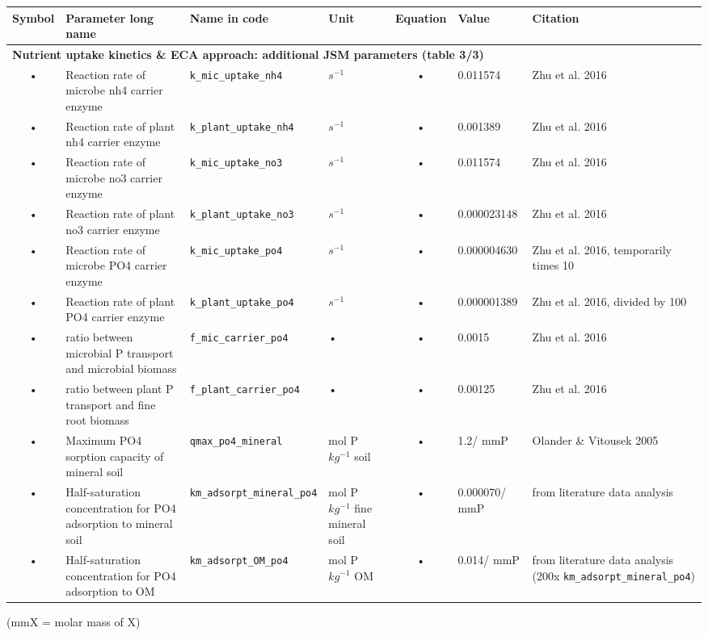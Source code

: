 \begin{table}
\begin{tabularx}{\linewidth}{|c|X|l|l|c|l|X|} %
\hline 
Symbol & Parameter long name & Name in code & Unit & Equation & Value & Citation \\ 
\hline 

\multicolumn{6}{l}{\bf Nutrient uptake kinetics \& ECA approach: additional JSM parameters (table 3/3)}\\
\hline
• & Reaction rate of microbe nh4 carrier enzyme & \texttt{k\_mic\_uptake\_nh4} & $s^{-1}$ & • & 0.011574 & Zhu et al. 2016 \\
• & Reaction rate of plant nh4 carrier enzyme & \texttt{k\_plant\_uptake\_nh4} & $s^{-1}$ & • & 0.001389 & Zhu et al. 2016 \\
• & Reaction rate of microbe no3 carrier enzyme & \texttt{k\_mic\_uptake\_no3} & $s^{-1}$ & • & 0.011574 & Zhu et al. 2016 \\
• & Reaction rate of plant no3 carrier enzyme & \texttt{k\_plant\_uptake\_no3} & $s^{-1}$ & • & 0.000023148 & Zhu et al. 2016 \\
• & Reaction rate of microbe PO4 carrier enzyme & \texttt{k\_mic\_uptake\_po4} & $s^{-1}$ & • & 0.000004630 & Zhu et al. 2016, temporarily times 10 \\
• & Reaction rate of plant PO4 carrier enzyme & \texttt{k\_plant\_uptake\_po4} & $s^{-1}$ & • & 0.000001389 & Zhu et al. 2016, divided by 100 \\
• & ratio between microbial P transport and microbial biomass & \texttt{f\_mic\_carrier\_po4} & • & • & 0.0015 & Zhu et al. 2016 \\
• & ratio between plant P transport and fine root biomass & \texttt{f\_plant\_carrier\_po4} & • & • & 0.00125 & Zhu et al. 2016 \\
• & Maximum PO4 sorption capacity of mineral soil & \texttt{qmax\_po4\_mineral} & mol P $kg^{-1}$ soil & • & 1.2/ mmP & Olander \& Vitousek 2005 \\
• & Half-saturation concentration for PO4 adsorption to mineral soil & \texttt{km\_adsorpt\_mineral\_po4} & mol P $kg^{-1}$ fine mineral soil & • & 0.000070/ mmP & from literature data analysis \\
• & Half-saturation concentration for PO4 adsorption to OM & \texttt{km\_adsorpt\_OM\_po4} & mol P $kg^{-1}$ OM & • & 0.014/ mmP & from literature data analysis (200x \texttt{km\_adsorpt\_mineral\_po4}) \\
\hline 
\end{tabularx}
(mmX = molar mass of X)
\end{table}

